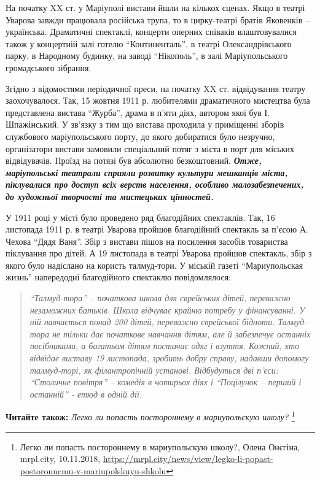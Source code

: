 На початку XX ст. у Маріуполі вистави йшли на кількох сценах. Якщо в театрі
Уварова завжди працювала російська трупа, то в цирку-театрі братів Яковенків –
українська. Драматичні спектаклі, концерти оперних співаків влаштовувалися
також у концертній залі готелю \enquote{Континенталь}, в театрі
Олександрівського парку, в Народному будинку, на заводі \enquote{Нікополь}, в
залі Маріупольського громадського зібрання.

Згідно з відомостями періодичної преси, на початку XX ст. відвідування театру
заохочувалося. Так, 15 жовтня 1911 р. любителями драматичного мистецтва була
представлена вистава \enquote{Журба}, драма в п'яти діях, автором якої був І.
Шпажінський. У зв'язку з тим що вистава проходила у приміщенні зборів
службового маріупольського порту, до якого добиратися було незручно,
організатори вистави замовили спеціальний потяг з міста в порт для міських
відвідувачів. Проїзд на потязі був абсолютно безкоштовний. \textbf{\em Отже, маріупольські
театрали сприяли розвитку культури мешканців міста, піклувалися про доступ всіх
верств населення, особливо малозабезпечених, до художньої творчості та
мистецьких цінностей.}


У 1911 році у місті було проведено ряд благодійних спектаклів. Так, 16
листопада 1911 р. в театрі Уварова пройшов благодійний спектакль за п'єсою А.
Чехова \enquote{Дядя Ваня}. Збір з вистави пішов на посилення засобів товариства
піклування про дітей. А 19 листопада в театрі Уварова пройшов спектакль, збір з
якого було надіслано на користь талмуд-тори. У міській газеті \enquote{Мариупольская
жизнь} напередодні благодійного спектаклю повідомлялося:

\begin{quote}
\em\enquote{Талмуд-тора} – початкова школа для єврейських дітей, переважно незаможних
батьків. Школа відчуває крайню потребу у фінансуванні. У ній навчається
понад 200 дітей, переважно єврейської бідноти. Талмуд-тора не тільки
дає початкове навчання дітям, але й забезпечує останніх посібниками, а
багатьом дітям постачає одяг і взуття. Кожний, хто відвідає виставу 19
листопада, зробить добру справу, надавши допомогу талмуд-торі, як
філантропічній установі. Відбудуться дві п'єси: \enquote{Столичне повітря} –
комедія в чотирьох діях і \enquote{Поцілунок – перший і останній} - етюд в
одній дії.
\end{quote}

\textbf{Читайте також:} \emph{Легко ли попасть постороннему в мариупольскую школу?}%
\footnote{Легко ли попасть постороннему в мариупольскую школу?, Олена Онєгіна, mrpl.city, 10.11.2018, \url{https://mrpl.city/news/view/legko-li-popast-postoronnemu-v-mariupolskuyu-shkolu}}

